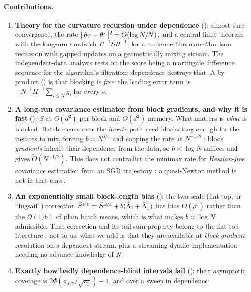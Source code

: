 \paragraph{Contributions.}
\begin{enumerate}[leftmargin=1.6em,itemsep=2pt,topsep=2pt]
\item \textbf{Theory for the curvature recursion under dependence} (): almost sure
      convergence, the rate $\lVert \theta_T-\theta^\star \rVert^2=O(\log N/N)$, and a central limit theorem with the
      long-run sandwich $H^{-1}SH^{-1}$, for a rank-one Sherman--Morrison recursion with gapped
      updates on a geometrically mixing stream. The independent-data analysis rests on the score being
      a martingale difference sequence for the algorithm's filtration; dependence destroys that. A
      by-product () is that blocking is \emph{free}: the leading error term is
      $-N^{-1}H^{-1}\sum_{i\le N}g_i$ for every $b$.
\item \textbf{A long-run covariance estimator from block gradients, and why it is fast}
      (): $S$ at $O(d^2)$ per block and $O(d^2)$ memory. What matters is \emph{what} is
      blocked. Batch means over the \emph{iterate} path need blocks long enough for the iterates to
      mix, forcing $b\asymp N^{3/4}$ and capping the rate at $N^{-1/8}$
      \citep{samsonov2025statistical}; block \emph{gradients} inherit their dependence from the data,
      so $b\asymp\log N$ suffices and  gives $\widetilde O(N^{-1/2})$. This does not
      contradict the minimax rate for \emph{Hessian-free} covariance estimation from an SGD trajectory
      \citep{ni2026online}: a quasi-Newton method is not in that class.
\item \textbf{An exponentially small block-length bias} (): the two-scale (flat-top, or
      ``lugsail'') correction $\widehat{S}^{\mathrm{FT}}=\widehat{S}^{\mathrm{BM}}+b(\hat\Lambda_1+\hat\Lambda_1^{\!\top})$ has bias $O(\rho^b)$
      rather than the $O(1/b)$ of plain batch means, which is what makes $b\asymp\log N$ admissible. That
      correction and its tail-sum property belong to the flat-top literature
      \citep{politis1995bias,vats2022lugsail,singh2025utility}, not to us; what we add is that they are
      available at \emph{block-gradient} resolution on a dependent stream, plus a streaming dyadic
      implementation needing no advance knowledge of $N$.
\item \textbf{Exactly how badly dependence-blind intervals fail} (): their
      asymptotic coverage is $2\Phi(z_{\alpha/2}/\sqrt{\kappa_j})-1$, and over a sweep in dependence

\end{enumerate}
